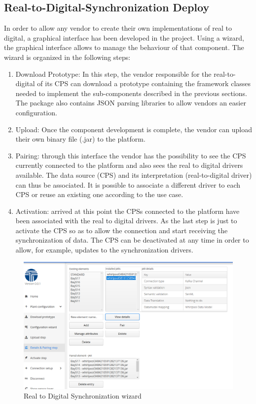 \subsection{Real-to-Digital-Synchronization Deploy}
In order to allow any vendor to create their own implementations of real to digital, a graphical interface has been developed in the project. Using a wizard, the graphical interface allows to manage the behaviour of that component. 
The wizard is organized in the following steps:
\begin{enumerate}
\item Download Prototype: In this step, the vendor responsible for the real-to-digital of its CPS can download a prototype containing the framework classes needed to implement the sub-components described in the previous sections. The package also contains JSON parsing libraries to allow vendors an easier configuration.
\item Upload: Once the component development is complete, the vendor can upload their own binary file (.jar) to the platform.
\item Pairing: through this interface the vendor has the possibility to see the CPS currently connected to the platform and also sees the real to digital drivers available. The data source (CPS) and its interpretation (real-to-digital driver) can thus be associated. It is possible to associate a different driver to each CPS or reuse an existing one according to the use case.
\item Activation: arrived at this point the CPSs connected to the platform have been associated with the real to digital drivers. As the last step is just to activate the CPS so as to allow the connection and start receiving the synchronization of data. The CPS can be deactivated at any time in order to allow, for example, updates to the synchronization drivers.
\end{enumerate}

\begin{figure}
  \includegraphics[width=\linewidth]{images/wizard.PNG}
  \caption{Real to Digital Synchronization wizard}
  \label{fig:wizard}
\end{figure}
